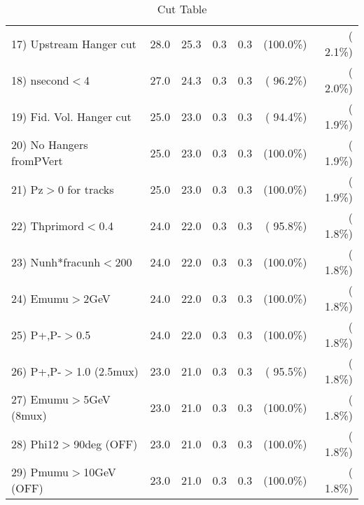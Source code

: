 \begin{table}[h!]
\begin{tabular}{||l||r|r|r|r|r|r||}
 17) Upstream Hanger cut  &         28.0 &         25.3 &          0.3 &          0.3 & (100.0\%) & (  2.1\%) \\
 18) nsecond$<$4          &         27.0 &         24.3 &          0.3 &          0.3 & ( 96.2\%) & (  2.0\%) \\
 19) Fid. Vol. Hanger cut &         25.0 &         23.0 &          0.3 &          0.3 & ( 94.4\%) & (  1.9\%) \\
 20) No Hangers fromPVert &         25.0 &         23.0 &          0.3 &          0.3 & (100.0\%) & (  1.9\%) \\
 21) Pz$>$0 for tracks    &         25.0 &         23.0 &          0.3 &          0.3 & (100.0\%) & (  1.9\%) \\
 22) Thprimord$<$0.4      &         24.0 &         22.0 &          0.3 &          0.3 & ( 95.8\%) & (  1.8\%) \\
 23) Nunh*fracunh$<$200   &         24.0 &         22.0 &          0.3 &          0.3 & (100.0\%) & (  1.8\%) \\
 24) Emumu$>$2GeV         &         24.0 &         22.0 &          0.3 &          0.3 & (100.0\%) & (  1.8\%) \\
 25) P+,P-$>$0.5          &         24.0 &         22.0 &          0.3 &          0.3 & (100.0\%) & (  1.8\%) \\
 26) P+,P-$>$1.0 (2.5mux) &         23.0 &         21.0 &          0.3 &          0.3 & ( 95.5\%) & (  1.8\%) \\
 27) Emumu$>$5GeV  (8mux) &         23.0 &         21.0 &          0.3 &          0.3 & (100.0\%) & (  1.8\%) \\
 28) Phi12$>$90deg  (OFF) &         23.0 &         21.0 &          0.3 &          0.3 & (100.0\%) & (  1.8\%) \\
 29) Pmumu$>$10GeV  (OFF) &         23.0 &         21.0 &          0.3 &          0.3 & (100.0\%) & (  1.8\%) \\
 \hline
 \hline
 \end{tabular}
 \caption{Cut Table           }
 \label{tab-cutcohjpsi-mumu_cohpip}
 \end{table}
